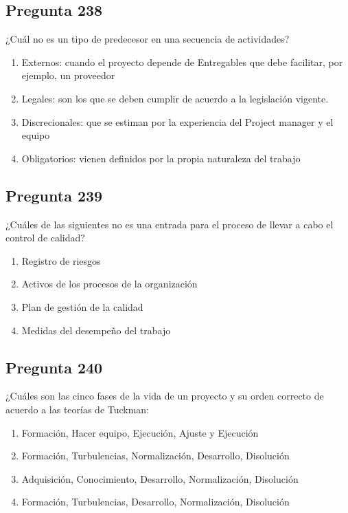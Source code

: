 \documentclass[11pt,a4paper]{article}
\begin{document}
\subsection*{Pregunta 238}
¿Cuál no es un tipo de predecesor en una secuencia de actividades?

\begin{enumerate}[label=\alph*)]
  \item Externos: cuando el proyecto depende de Entregables que debe facilitar, por ejemplo, un proveedor
  \item Legales: son los que se deben cumplir de acuerdo a la legislación vigente.
  \item Discrecionales: que se estiman por la experiencia del Project manager y el equipo
  \item Obligatorios: vienen definidos por la propia naturaleza del trabajo
\end{enumerate}

\subsection*{Pregunta 239}
¿Cuáles de las siguientes no es una entrada para el proceso de llevar a cabo el control de calidad?

\begin{enumerate}[label=\alph*)]
  \item Registro de riesgos
  \item Activos de los procesos de la organización
  \item Plan de gestión de la calidad
  \item Medidas del desempeño del trabajo
\end{enumerate}

\subsection*{Pregunta 240}
¿Cuáles son las cinco fases de la vida de un proyecto y su orden correcto de acuerdo a las teorías de Tuckman:

\begin{enumerate}[label=\alph*)]
  \item Formación, Hacer equipo, Ejecución, Ajuste y Ejecución
  \item Formación, Turbulencias, Normalización, Desarrollo, Disolución
  \item Adquisición, Conocimiento, Desarrollo, Normalización, Disolución
  \item Formación, Turbulencias, Desarrollo, Normalización, Disolución
\end{enumerate}
\end{document}
